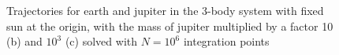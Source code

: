\documentclass[10pt,showpacs,preprintnumbers,amsmath,amssymb,nofootinbib,aps,prl,twocolumn,groupedaddress,superscriptaddress,showkeys]{revtex4-1}
\begin{document}
  \begin{figure}[H]
    \center
    \\
    \\
    \caption{Trajectories for earth and jupiter in the 3-body system with fixed sun at the origin, with the mass of jupiter multiplied by a factor 10 (b) and $10^3$ (c) solved with $N=10^6$ integration points}
    \label{fig:exe jupiter mass increase}
  \end{figure}
  
\end{document}
